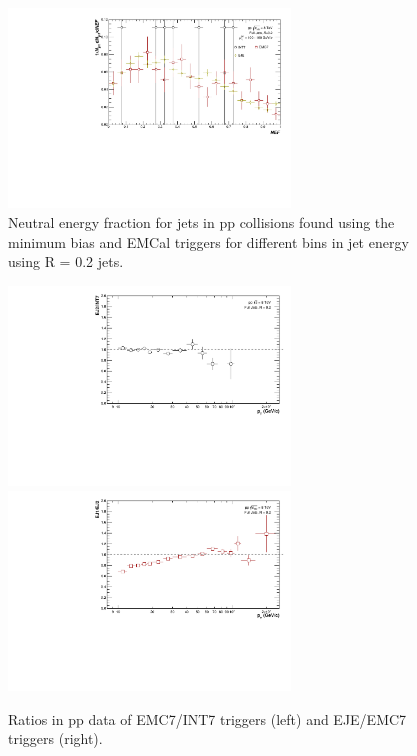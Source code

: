 \documentclass[ALICE]{ALICE_analysis_notes}
\newcommand{\pp}{pp\xspace}
\begin{document}
\begin{figure}[h!]
\begin{multicols}{2}
            \includegraphics[width=7.5cm]{figures/NEF/All/hNEF_100-160GeV_R02.pdf}
        \vfill\null
    \end{multicols}
    \caption{Neutral energy fraction for jets in \pp collisions found using the minimum bias and EMCal triggers for different bins in jet energy using R = 0.2 jets.}
    \label{fig:NEF}
\end{figure}

\begin{figure}[h!]
    \centering
    \begin{multicols}{2}
            \includegraphics[width=7.5cm]{figures/TriggerSwap/ratio_EMCINT_data_R02.pdf}
        \vfill\null 
        \columnbreak
            \includegraphics[width=7.5cm]{figures/TriggerSwap/ratio_EJEEMC_data_R02.pdf}
        \vfill\null
    \end{multicols}
    \caption{Ratios in \pp data of EMC7/INT7 triggers (left) and EJE/EMC7 triggers (right).}
    \label{fig:trigger_ratios}
\end{figure}
\end{document}
